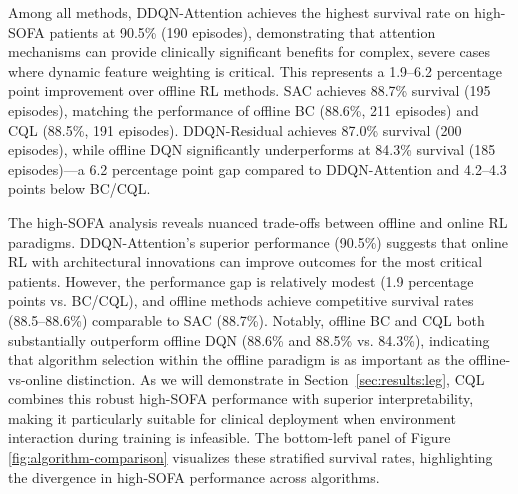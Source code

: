 Among all methods, DDQN-Attention achieves the highest survival rate on high-SOFA patients at 90.5\% (190 episodes), demonstrating that attention mechanisms can provide clinically significant benefits for complex, severe cases where dynamic feature weighting is critical. This represents a 1.9--6.2 percentage point improvement over offline RL methods. SAC achieves 88.7\% survival (195 episodes), matching the performance of offline BC (88.6\%, 211 episodes) and CQL (88.5\%, 191 episodes). DDQN-Residual achieves 87.0\% survival (200 episodes), while offline DQN significantly underperforms at 84.3\% survival (185 episodes)—a 6.2 percentage point gap compared to DDQN-Attention and 4.2--4.3 points below BC/CQL.

The high-SOFA analysis reveals nuanced trade-offs between offline and online RL paradigms. DDQN-Attention's superior performance (90.5\%) suggests that online RL with architectural innovations can improve outcomes for the most critical patients. However, the performance gap is relatively modest (1.9 percentage points vs. BC/CQL), and offline methods achieve competitive survival rates (88.5--88.6\%) comparable to SAC (88.7\%). Notably, offline BC and CQL both substantially outperform offline DQN (88.6\% and 88.5\% vs. 84.3\%), indicating that algorithm selection within the offline paradigm is as important as the offline-vs-online distinction. As we will demonstrate in Section~\ref{sec:results:leg}, CQL combines this robust high-SOFA performance with superior interpretability, making it particularly suitable for clinical deployment when environment interaction during training is infeasible. The bottom-left panel of Figure \ref{fig:algorithm-comparison} visualizes these stratified survival rates, highlighting the divergence in high-SOFA performance across algorithms.

